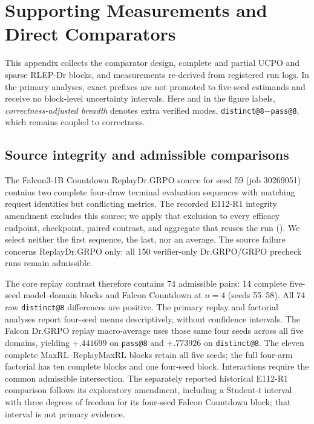 \section{Supporting Measurements and Direct Comparators}
\label{app:supporting}

This appendix collects the comparator design, complete and partial UCPO and
sparse RLEP-Dr blocks, and measurements re-derived from
registered run logs. In the primary analyses, exact prefixes are not promoted
to five-seed estimands and receive no block-level uncertainty intervals. Here and in the figure
labels, \emph{correctness-adjusted breadth} denotes extra verified modes,
\texttt{distinct@8}$-$\texttt{pass@8}, which remains coupled to correctness.

\subsection{Source integrity and admissible comparisons}
\label{app:source-integrity}

The Falcon3-1B Countdown ReplayDr.GRPO source for seed 59 (job 30269051)
contains two complete four-draw terminal evaluation sequences with matching
request identities but conflicting metrics. The recorded E112-R1 integrity
amendment excludes this source; we apply that exclusion to every efficacy
endpoint, checkpoint, paired contrast, and aggregate that reuses the run
().
We select neither the first sequence, the last, nor an average. The source
failure concerns ReplayDr.GRPO only: all 150 verifier-only Dr.GRPO/GRPO
precheck runs remain admissible.

The core replay contrast therefore contains 74 admissible pairs: 14 complete
five-seed model--domain blocks and Falcon Countdown at $n=4$ (seeds 55--58).
All 74 raw \texttt{distinct@8} differences are positive. The primary replay
and factorial analyses report four-seed means descriptively, without
confidence intervals. The Falcon
Dr.GRPO replay macro-average uses those same four seeds across all five
domains, yielding $+.441699$ on \texttt{pass@8} and $+.773926$ on
\texttt{distinct@8}. The eleven complete MaxRL--ReplayMaxRL blocks retain all
five seeds; the full four-arm factorial has ten complete blocks and one
four-seed block. Interactions require the common admissible intersection. The separately
reported historical E112-R1 comparison follows its exploratory amendment,
including a Student-$t$ interval with three degrees of freedom for its
four-seed Falcon Countdown block; that interval is not primary evidence.

